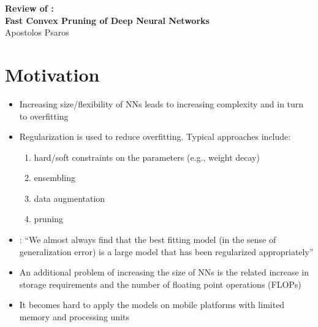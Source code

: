 
\setlength{\belowcaptionskip}{-20pt}

	
	\sloppy
	
	\begin{center}	
		\Large
		\textbf{Review of \textcite{aghasi2020fast}: \\
			Fast Convex Pruning of Deep Neural Networks}\\
		\large
		Apostolos Psaros\\	
	\end{center}
	\vskip 0.5in
	

\section{Motivation}
\begin{itemize}
	\item Increasing size/flexibility of NNs leads to increasing complexity and in turn to overfitting 
	\item Regularization is used to reduce overfitting. Typical approaches include:
	\begin{enumerate}
		\item hard/soft constraints on the parameters (e.g., weight decay)
		\item ensembling
		\item data augmentation
		\item pruning
	\end{enumerate}
	\item \textcite{goodfellow2016deep}: ``We almost always find that the best fitting model (in the sense of generalization error) is a large model that has been regularized appropriately''
	\item An additional problem of increasing the size of NNs is the related increase in storage requirements and the number of floating point operations (FLOPs)
	\item It becomes hard to apply the models on mobile platforms with limited memory and processing units
\end{itemize}

